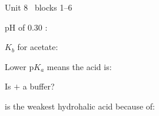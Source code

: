\documentclass{apchem-worksheet}
\begin{document}
\begin{spiralstrip}{Unit 8 \textbullet\ blocks 1--6}
  \item pH of \SI{0.30}{\Molar} : 
  \item $K_b$ for acetate: 
  \item Lower p$K_a$ means the acid is: 
  \item Is  $+$  a buffer? 
  \item {} is the weakest hydrohalic acid because of:
\end{spiralstrip}
\end{document}

